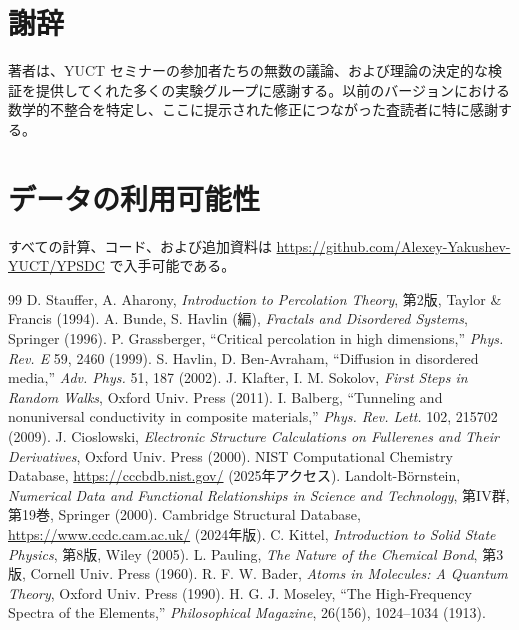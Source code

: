 \documentclass[11pt,a4paper]{article}
\begin{document}
	\section*{謝辞}
	
	著者は、YUCT セミナーの参加者たちの無数の議論、および理論の決定的な検証を提供してくれた多くの実験グループに感謝する。以前のバージョンにおける数学的不整合を特定し、ここに提示された修正につながった査読者に特に感謝する。
	
	\section*{データの利用可能性}
	
	すべての計算、コード、および追加資料は \url{https://github.com/Alexey-Yakushev-YUCT/YPSDC} で入手可能である。
	
	\begin{thebibliography}{99}
		 D. Stauffer, A. Aharony, \emph{Introduction to Percolation Theory}, 第2版, Taylor \& Francis (1994).
		 A. Bunde, S. Havlin (編), \emph{Fractals and Disordered Systems}, Springer (1996).
		 P. Grassberger, ``Critical percolation in high dimensions,'' \emph{Phys. Rev. E} 59, 2460 (1999).
		 S. Havlin, D. Ben-Avraham, ``Diffusion in disordered media,'' \emph{Adv. Phys.} 51, 187 (2002).
		 J. Klafter, I. M. Sokolov, \emph{First Steps in Random Walks}, Oxford Univ. Press (2011).
		 I. Balberg, ``Tunneling and nonuniversal conductivity in composite materials,'' \emph{Phys. Rev. Lett.} 102, 215702 (2009).
		 J. Cioslowski, \emph{Electronic Structure Calculations on Fullerenes and Their Derivatives}, Oxford Univ. Press (2000).
		 NIST Computational Chemistry Database, \url{https://cccbdb.nist.gov/} (2025年アクセス).
		 Landolt-Börnstein, \emph{Numerical Data and Functional Relationships in Science and Technology}, 第IV群, 第19巻, Springer (2000).
		 Cambridge Structural Database, \url{https://www.ccdc.cam.ac.uk/} (2024年版).
		 C. Kittel, \emph{Introduction to Solid State Physics}, 第8版, Wiley (2005).
		 L. Pauling, \emph{The Nature of the Chemical Bond}, 第3版, Cornell Univ. Press (1960).
		 R. F. W. Bader, \emph{Atoms in Molecules: A Quantum Theory}, Oxford Univ. Press (1990).
		 H. G. J. Moseley, ``The High-Frequency Spectra of the Elements,'' \emph{Philosophical Magazine}, 26(156), 1024–1034 (1913).
	\end{thebibliography}
	
\end{document}
